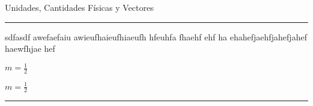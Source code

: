 \documentclass{article}
\newcommand{\textoformula}[2]{%
    \vspace{0.8cm}
    \hspace{1cm}
    \begin{minipage}[t]{0.49\textwidth}
        \vspace{0pt}
        \small{#1}
    \end{minipage}
    \hspace{0.4cm}
    \begin{minipage}[t]{0.9\textwidth}
        \vspace{0pt}
        #2
    \end{minipage}
    \vspace{0.8cm}
    \hrule
}
\newcommand{\capitulo}[1]{
    \pagebreak
    \vspace{1em}
    \hspace{1cm}
    {\Huge\textcolor{celeste}{\textsf{#1}}}\\[0.5em]
    \vspace{1em}
    \hrule
    
}
\newcommand{\for}[1]{
  \par $#1$
  \vspace{0.5cm}
}
\begin{document}
    \newpage

    \capitulo{Unidades, Cantidades Físicas y Vectores}

    \textoformula{
      \par sdfasdf awefaefaiu  awieufhaieufhiaeufh hfeuhfa fhaehf ehf ha ehahefjaehfjahefjahef haewfhjae hef
    }{
      \for{m = \frac{1}{2}}

      \for{m = \frac{1}{2}}
    }
\end{document}
